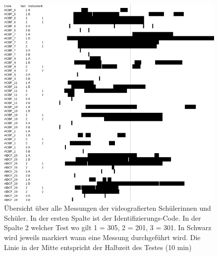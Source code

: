   
  
   \begin{figure}[htp]
   \centering
   \includegraphics[width=1.0\linewidth]{graphics/Messungen2.png}
   \caption{Übersicht über alle Messungen der videografierten Schülerinnen und Schüler. In der ersten Spalte ist der Identifizierungs-Code. In der Spalte 2 welcher Test wo gilt 1 = 305, 2 = 201, 3 = 301. In Schwarz wird jeweils markiert wann eine Messung durchgeführt wird. Die Linie in der Mitte entspricht der Halbzeit des Testes (10 min)}
   \label{fig:Messungen}
   \end{figure}
   
  